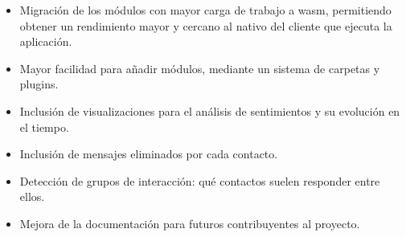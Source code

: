 \begin{itemize}

\item Migración de los módulos con mayor carga de trabajo a \acrfull{wasm}, permitiendo obtener un rendimiento mayor y cercano al nativo del cliente que ejecuta la aplicación.

\item Mayor facilidad para añadir módulos, mediante un sistema de carpetas y plugins.

\item Inclusión de visualizaciones para el análisis de sentimientos y su evolución en el tiempo.

\item Inclusión de mensajes eliminados por cada contacto.

\item Detección de grupos de interacción: qué contactos suelen responder entre ellos.

\item Mejora de la documentación para futuros contribuyentes al proyecto.

\end{itemize}
